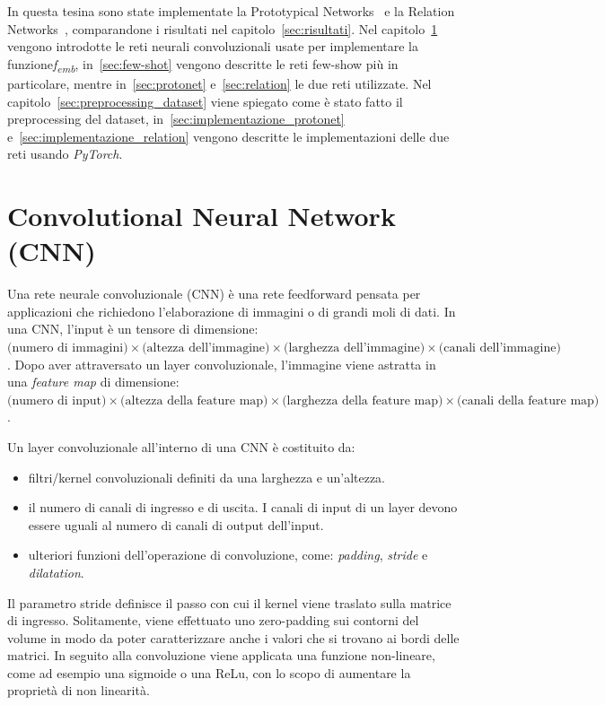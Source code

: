 \documentclass[12pt,a4paper,titlepage]{article}
\begin{document}
In questa tesina sono state implementate la Prototypical Networks~\cite{snell:prototypical} e la Relation Networks~\cite{DBLP:journals/corr/abs-1711-06025}, comparandone i risultati nel capitolo~\ref{sec:risultati}. Nel capitolo~\ref{sec:cnn} vengono introdotte le reti neurali convoluzionali usate per implementare la  funzione\textit{f\textsubscript{emb}}, in~\ref{sec:few-shot} vengono descritte le reti few-show più in particolare, mentre in~\ref{sec:protonet} e~\ref{sec:relation} le due reti utilizzate. Nel capitolo~\ref{sec:preprocessing_dataset} viene spiegato come è stato fatto il preprocessing del dataset, in~\ref{sec:implementazione_protonet} e~\ref{sec:implementazione_relation} vengono descritte le implementazioni delle due reti usando \textit{PyTorch}.

\clearpage

\section{Convolutional Neural Network (CNN)}
\label{sec:cnn}
Una rete neurale convoluzionale (CNN) è una rete feedforward pensata per applicazioni che richiedono l'elaborazione di immagini o di grandi moli di dati.
In una CNN, l'input è un tensore di dimensione: $\text{(numero di immagini)} \times \text{(altezza dell'immagine)} \times \text{(larghezza dell'immagine)} \times \text{(canali dell'immagine)}$. Dopo aver attraversato un layer convoluzionale, l'immagine viene astratta in una \textit{feature map} di dimensione: $\text{(numero di input)} \times \text{(altezza della feature map)} \times \text{(larghezza della feature map)} \times \text{(canali della feature map)}$. 

Un layer convoluzionale all'interno di una CNN è costituito da: 
\begin{itemize}
\item filtri/kernel convoluzionali definiti da una larghezza e un'altezza. 
\item il numero di canali di ingresso e di uscita. I canali di input di un layer devono essere uguali al numero di canali di output dell'input. 
\item ulteriori funzioni dell'operazione di convoluzione, come: \textit{padding}, \textit{stride} e \textit{dilatation}.
\end{itemize}

Il parametro stride definisce il passo con cui il kernel viene traslato sulla matrice di ingresso. Solitamente, viene effettuato uno zero-padding sui contorni del volume in modo da poter caratterizzare anche i valori che si trovano ai bordi delle matrici. In seguito alla convoluzione viene applicata una funzione non-lineare, come ad esempio una sigmoide o una ReLu, con lo scopo di aumentare la proprietà di non linearità.
\end{document}

